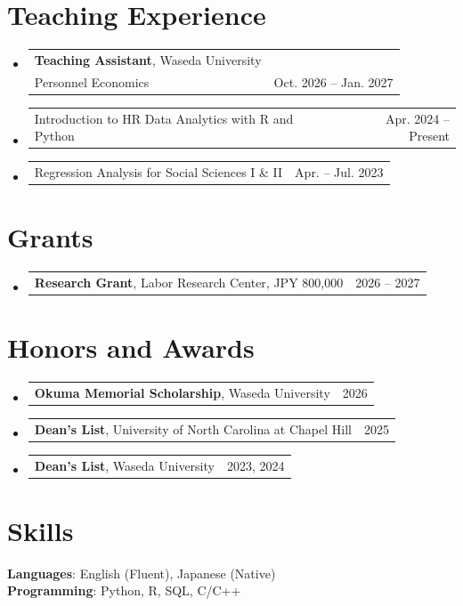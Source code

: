 \documentclass[letterpaper,11pt]{article}
\makeatletter
\newcommand{\resumeItem}[1]{
  \item\small{
    {#1 \vspace{-2pt}}
  }
}
\newcommand{\resumeSubheading}[4]{
  \vspace{-2pt}\item
    \begin{tabular*}{0.97\textwidth}[t]{l@{\extracolsep{\fill}}r}
      \expandafter#1 & {\small #2} \\
      {\small#3} & {\small #4} \\
    \end{tabular*}\vspace{-7pt}
}
\newcommand{\resumeSubSubheading}[2]{
    \item
    \begin{tabular*}{0.97\textwidth}{l@{\extracolsep{\fill}}r}
      {\small#1} & {\small #2} \\
    \end{tabular*}\vspace{-7pt}
}
\newcommand{\resumeSubHeadingListStart}{\begin{itemize}[leftmargin=0.15in, label={}]}
\newcommand{\resumeSubHeadingListEnd}{\end{itemize}}
\newcommand{\resumeItemListStart}{\begin{itemize}}
\newcommand{\resumeItemListEnd}{\end{itemize}\vspace{-5pt}}
\makeatother
\begin{document}
\section{Teaching Experience}
    \resumeSubHeadingListStart
    \resumeSubheading
      {\textbf{Teaching Assistant}, Waseda University}{}
      {Personnel Economics}{Oct. 2026 -- Jan. 2027}
    \resumeSubSubheading
      {Introduction to HR Data Analytics with R and Python}{Apr. 2024 -- Present}
    \resumeSubSubheading
      {Regression Analysis for Social Sciences I \& II}{Apr. -- Jul. 2023}
  \resumeSubHeadingListEnd

\section{Grants}
    \resumeSubHeadingListStart
    \resumeSubSubheading
      {\textbf{Research Grant}, Labor Research Center, JPY 800,000}{2026 -- 2027}
    \resumeSubHeadingListEnd

\section{Honors and Awards}
    \resumeSubHeadingListStart
    \resumeSubSubheading
      {\textbf{Okuma Memorial Scholarship}, Waseda University}{2026}
    \resumeSubSubheading
      {\textbf{Dean's List}, University of North Carolina at Chapel Hill}{2025}
    \resumeSubSubheading
      {\textbf{Dean's List}, Waseda University}{2023, 2024}
    \resumeSubHeadingListEnd

\section{Skills}
 \begin{itemize}[leftmargin=0.15in, label={}]
    \small{\item{
    \textbf{Languages}{: English (Fluent), Japanese (Native)} \\
    \vspace{1mm}
    \textbf{Programming}{: Python, R, SQL, C/C++} \\
    }}
 \end{itemize}
\end{document}
